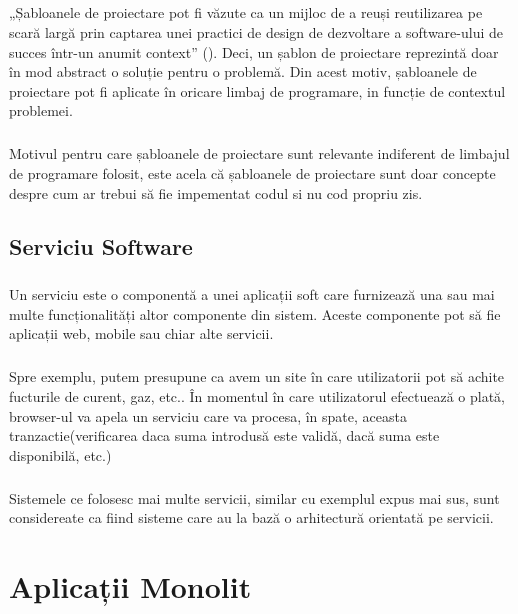 \documentclass[12pt]{report}
\begin{document}
    \paragraph{}„Șabloanele de proiectare pot fi văzute ca un mijloc de a reuși reutilizarea pe scară largă prin captarea unei practici de design de dezvoltare a software-ului de succes într-un anumit context” (\cite{alencar1996formal}).
  Deci, un șablon de proiectare reprezintă doar în mod abstract o soluție pentru o problemă. Din acest motiv, șabloanele de proiectare pot fi aplicate în oricare limbaj de programare, in funcție de contextul problemei.
  \paragraph{}Motivul pentru care șabloanele de proiectare sunt relevante indiferent de limbajul de programare folosit, este acela că șabloanele de proiectare sunt doar concepte despre cum ar trebui să fie impementat codul si nu cod propriu zis.
  \section{Serviciu Software}
  \paragraph{}
  Un serviciu este o componentă a unei aplicații soft care furnizează una sau mai multe funcționalități altor componente din sistem. Aceste componente pot să fie aplicații web, mobile sau chiar alte servicii.
  \paragraph{}
  Spre exemplu, putem presupune ca avem un site în care utilizatorii pot să achite fucturile de curent, gaz, etc.. În momentul în care utilizatorul efectuează o plată, browser-ul va apela un serviciu care va procesa, în spate, aceasta tranzactie(verificarea daca suma introdusă este validă, dacă suma este disponibilă, etc.)
  \paragraph{}
  Sistemele ce folosesc mai multe servicii, similar cu exemplul expus mai sus, sunt considereate ca fiind sisteme care au la bază o arhitectură orientată pe servicii.
  \chapter{Aplicații Monolit}
\end{document}
